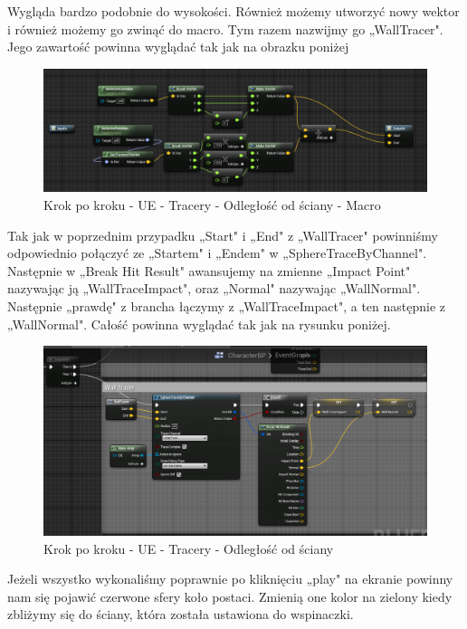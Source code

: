 \documentclass[12pt]{xmgr}
\begin{document}
Wygląda bardzo podobnie do wysokości. Również możemy utworzyć nowy wektor i również możemy go zwinąć do macro. Tym razem nazwijmy go „WallTracer". Jego zawartość powinna wyglądać tak jak na obrazku poniżej

\begin{figure}[!htb]
    \begin{center}
    \includegraphics[scale=0.5]{Screeny/UeKrokPoKroku/WallMacro}
    \end{center}
    \caption{Krok po kroku - UE - Tracery - Odległość od ściany - Macro}
\end{figure}
\newpage
Tak jak w poprzednim przypadku „Start" i „End" z „WallTracer" powinniśmy odpowiednio połączyć ze „Startem" i „Endem" w „SphereTraceByChannel". Następnie w „Break Hit Result" awansujemy na zmienne „Impact Point" nazywając ją „WallTraceImpact", oraz „Normal" nazywając „WallNormal". Następnie „prawdę" z brancha łączymy z „WallTraceImpact", a ten następnie z „WallNormal". Całość powinna wyglądać tak jak na rysunku poniżej.

\begin{figure}[!htb]
    \begin{center}
    \includegraphics[scale=0.5]{Screeny/UeKrokPoKroku/UE-WallTracer}
    \end{center}
    \caption{Krok po kroku - UE - Tracery - Odległość od ściany}
\end{figure}
\newpage
Jeżeli wszystko wykonaliśmy poprawnie po kliknięciu „play" na ekranie powinny nam się pojawić czerwone sfery koło postaci. Zmienią one kolor na zielony kiedy zbliżymy się do ściany, która została ustawiona do wspinaczki.
\end{document}
